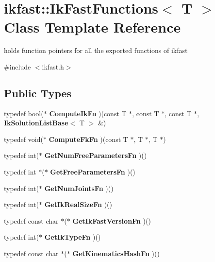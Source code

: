 \section{ikfast\-:\-:Ik\-Fast\-Functions$<$ T $>$ Class Template Reference}
\label{classikfast_1_1_ik_fast_functions}


holds function pointers for all the exported functions of ikfast  




{\ttfamily \#include $<$ikfast.\-h$>$}

\subsection*{Public Types}
\begin{DoxyCompactItemize}
\item 
typedef bool($\ast$ {\bfseries Compute\-Ik\-Fn} )(const T $\ast$, const T $\ast$, const T $\ast$, {\bf Ik\-Solution\-List\-Base}$<$ T $>$ \&)\label{classikfast_1_1_ik_fast_functions_aca5c2cbe37c8b2c5702260271c343c93}

\item 
typedef void($\ast$ {\bfseries Compute\-Fk\-Fn} )(const T $\ast$, T $\ast$, T $\ast$)\label{classikfast_1_1_ik_fast_functions_ab698a598e5939f90d8fdd2c63df2c54a}

\item 
typedef int($\ast$ {\bfseries Get\-Num\-Free\-Parameters\-Fn} )()\label{classikfast_1_1_ik_fast_functions_a695aee8cc2b98f60530c9153beb73875}

\item 
typedef int $\ast$($\ast$ {\bfseries Get\-Free\-Parameters\-Fn} )()\label{classikfast_1_1_ik_fast_functions_a57201a37ce2e50c380973d43007b3d95}

\item 
typedef int($\ast$ {\bfseries Get\-Num\-Joints\-Fn} )()\label{classikfast_1_1_ik_fast_functions_a884a76902ea19aad90175f34019a9b1e}

\item 
typedef int($\ast$ {\bfseries Get\-Ik\-Real\-Size\-Fn} )()\label{classikfast_1_1_ik_fast_functions_a2e8f2262c7cdf81524d750f929981739}

\item 
typedef const char $\ast$($\ast$ {\bfseries Get\-Ik\-Fast\-Version\-Fn} )()\label{classikfast_1_1_ik_fast_functions_a18988dda73efc7ebb14ed4f55949613a}

\item 
typedef int($\ast$ {\bfseries Get\-Ik\-Type\-Fn} )()\label{classikfast_1_1_ik_fast_functions_a021e3fbd64fd58836e04469fd340108e}

\item 
typedef const char $\ast$($\ast$ {\bfseries Get\-Kinematics\-Hash\-Fn} )()\label{classikfast_1_1_ik_fast_functions_a5978dc6cbc708ab07bee0b595ecf0e60}

\end{DoxyCompactItemize}

